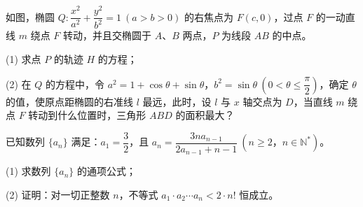 \begin{question}
如图，椭圆 $Q:\dfrac{x^2}{a^2}+\dfrac{y^2}{b^2}=1\ (a>b>0)$ 的右焦点为 $F(c,0)$，过点 $F$ 的一动直线 $m$ 绕点 $F$ 转动，并且交椭圆于 $A\text{、}B$ 两点，$P$ 为线段 $AB$ 的中点。

(1) 求点 $P$ 的轨迹 $H$ 的方程；

(2) 在 $Q$ 的方程中，令 $a^2=1+\cos\theta+\sin\theta\text{，}b^2=\sin\theta\ \left(0<\theta\leqslant\dfrac\pi2\right)$，确定 $\theta$ 的值，使原点距椭圆的右准线 $l$ 最远，此时，设 $l$ 与 $x$ 轴交点为 $D$，当直线 $m$ 绕点 $F$ 转动到什么位置时，三角形 $ABD$ 的面积最大？
\nopagebreak[4]
\begin{center}\end{center}
\nopagebreak[4]
\end{question}
\begin{question}
已知数列 $\{a_n\}$ 满足：$a_1=\dfrac32$，且 $a_n=\dfrac{3na_{n-1}}{2a_{n-1}+n-1}\ (n\geqslant2\text{，}n\in\mathbb N^*)$。

(1) 求数列 $\{a_n\}$ 的通项公式；

(2) 证明：对一切正整数 $n$，不等式 $a_1\cdot a_2\cdots a_n<2\cdot n!$ 恒成立。

\end{question}